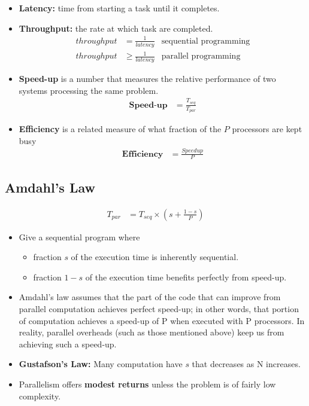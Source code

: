 \documentclass[../main.tex]{subfiles}
\begin{document}
\begin{itemize}
	\item \textbf{Latency:} time from starting a task until it completes.
	\item \textbf{Throughput:} the rate at which task are completed.
	      \begin{align*}
		      throughput & = \frac{1}{latency}    & \text{sequential programming} \\
		      throughput & \geq \frac{1}{latency} & \text{parallel programming}
	      \end{align*}
	\item \textbf{Speed-up} is a number that measures the relative performance of two systems processing the same problem.
	      \begin{align*}
		      \textbf{Speed-up} & = \frac{T_{seq}}{T_{par}}
	      \end{align*}
	\item \textbf{Efficiency} is a related measure of what fraction of the $P$ processors are kept busy
	      \begin{align*}
		      \textbf{Efficiency} & = \frac{Speedup}{P}
	      \end{align*}
\end{itemize}

\subsection{Amdahl's Law}

\begin{align*}
	T_{par} & = T_{seq} \times (s + \frac{1-s}{P})
\end{align*}

\begin{itemize}
	\item Give a sequential program where
	      \begin{itemize}
		      \item fraction \(s\) of the execution time is inherently sequential.
		      \item fraction \(1-s\) of the execution time benefits perfectly from speed-up.
	      \end{itemize}
	\item Amdahl’s law assumes that the part of the code that can improve from parallel computation achieves perfect speed-up; in other words, that portion of computation achieves a speed-up of P when executed with P processors. In reality, parallel overheads (such as those mentioned above) keep us from achieving such a speed-up.
	\item \textbf{Gustafson's Law:} Many computation have \(s\) that decreases as N increases.
	\item Parallelism offers \textbf{modest returns} unless the problem is of fairly low complexity.
\end{itemize}
\end{document}
